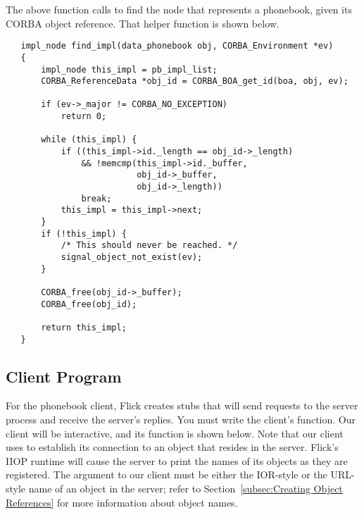 The above function calls  to find the node that represents
a phonebook, given its CORBA object reference.  That helper function is shown
below.

\begin{verbatim}
   impl_node find_impl(data_phonebook obj, CORBA_Environment *ev)
   {
       impl_node this_impl = pb_impl_list;
       CORBA_ReferenceData *obj_id = CORBA_BOA_get_id(boa, obj, ev);

       if (ev->_major != CORBA_NO_EXCEPTION)
           return 0;

       while (this_impl) {
           if ((this_impl->id._length == obj_id->_length)
               && !memcmp(this_impl->id._buffer,
                          obj_id->_buffer,
                          obj_id->_length))
               break;
           this_impl = this_impl->next;
       }
       if (!this_impl) {
           /* This should never be reached. */
           signal_object_not_exist(ev);
       }

       CORBA_free(obj_id->_buffer);
       CORBA_free(obj_id);

       return this_impl;
   }
\end{verbatim}



\subsection{Client Program}
\label{subsec:Client Program}

For the phonebook client, Flick creates stubs that will send requests to the
server process and receive the server's replies.  You must write the client's
 function.  Our client will be interactive, and its
 function is shown below.  Note that our client uses
 to establish its connection to an object
that resides in the server.  Flick's IIOP runtime will cause the server to
print the names of its objects as they are registered.  The argument to our
client must be either the IOR-style or the URL-style name of an object in the
server; refer to Section~\ref{subsec:Creating Object References} for more
information about object names.

